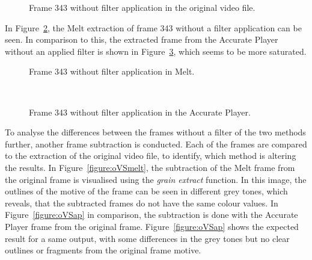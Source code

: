 \documentclass[../MasterThesis.tex]{subfiles}
\begin{document}
\begin{figure}[H]
	\begin{center}
		\caption[Frame 343 without filter application in the original video file.]{Frame 343 without filter application in the original video file.}
		\label{figure:nofilterO}
	\end{center}
\end{figure}


In Figure~\ref{figure:nofilterMelt}, the Melt extraction of frame 343 without a filter application can be seen. In comparison to this, the extracted frame from the Accurate Player without an applied filter is shown in Figure~\ref{figure:nofilterAP}, which seems to be more saturated.


\begin{minipage}{0.48\textwidth}
	\begin{figure}[H]
		\begin{center}
			\caption[Frame 343 without filter application in Melt.]{Frame 343 without filter application in Melt.}
			\label{figure:nofilterMelt}
		\end{center}
	\end{figure}
\end{minipage}\begin{minipage}{0.04\textwidth}
	\ 
\end{minipage}\begin{minipage}{0.48\textwidth}
	\begin{figure}[H]
		\begin{center}
			\caption[Frame 343 without filter application in the Accurate Player.]{Frame 343 without filter application in the Accurate Player.}
			\label{figure:nofilterAP}
		\end{center}
	\end{figure}
\end{minipage}

\vspace*{1.5em}
To analyse the differences between the frames without a filter of the two methods further, another frame subtraction is conducted. Each of the frames are compared to the extraction of the original video file, to identify, which method is altering the results.
In Figure~\ref{figure:oVSmelt}, the subtraction of the Melt frame from the original frame is visualised using the \textit{grain extract} function. In this image, the outlines of the motive of the frame can be seen in different grey tones, which reveals, that the subtracted frames do not have the same colour values.
In Figure~\ref{figure:oVSap} in comparison, the subtraction is done with the Accurate Player frame from the original frame. Figure~\ref{figure:oVSap} shows the expected result for a same output, with some differences in the grey tones but no clear outlines or fragments from the original frame motive.
\end{document}
